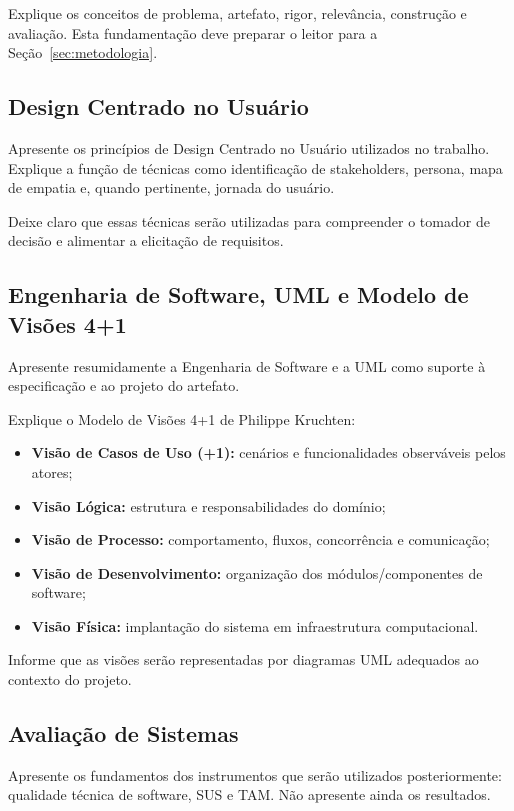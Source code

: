 \documentclass[12pt]{article}
\begin{document}
Explique os conceitos de problema, artefato, rigor, relevância, construção e avaliação. Esta fundamentação deve preparar o leitor para a Seção~\ref{sec:metodologia}.

\subsection{Design Centrado no Usuário}

Apresente os princípios de Design Centrado no Usuário utilizados no trabalho. Explique a função de técnicas como identificação de stakeholders, persona, mapa de empatia e, quando pertinente, jornada do usuário.

Deixe claro que essas técnicas serão utilizadas para compreender o tomador de decisão e alimentar a elicitação de requisitos.

\subsection{Engenharia de Software, UML e Modelo de Visões 4+1}

Apresente resumidamente a Engenharia de Software e a UML como suporte à especificação e ao projeto do artefato.

Explique o Modelo de Visões 4+1 de Philippe Kruchten:
\begin{itemize}[noitemsep]
    \item \textbf{Visão de Casos de Uso (+1):} cenários e funcionalidades observáveis pelos atores;
    \item \textbf{Visão Lógica:} estrutura e responsabilidades do domínio;
    \item \textbf{Visão de Processo:} comportamento, fluxos, concorrência e comunicação;
    \item \textbf{Visão de Desenvolvimento:} organização dos módulos/componentes de software;
    \item \textbf{Visão Física:} implantação do sistema em infraestrutura computacional.
\end{itemize}

Informe que as visões serão representadas por diagramas UML adequados ao contexto do projeto.

\subsection{Avaliação de Sistemas}

Apresente os fundamentos dos instrumentos que serão utilizados posteriormente:
qualidade técnica de software, SUS e TAM. Não apresente ainda os resultados.
\end{document}
